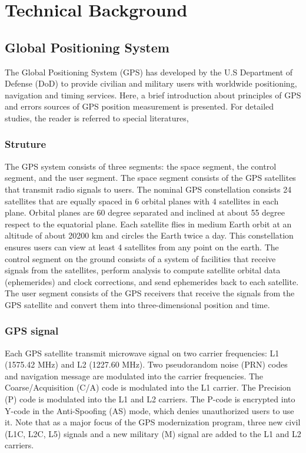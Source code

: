 \chapter{Technical Background}
\section{Global Positioning System}
The Global Positioning System (GPS) has developed by the U.S Department of Defense (DoD) to provide civilian and military users with worldwide positioning, navigation and timing services.  Here, a brief introduction about principles of GPS and errors sources of GPS position measurement is presented.  For detailed studies, the reader is referred to special literatures, \citet[e.g.,][]{dixon1991chpt2,mao1999noise,hofmann2001gps}
  
\subsection{Struture}
The GPS system consists of three segments: the space segment, the control segment, and the user segment.  The space segment consists of the GPS satellites that transmit radio signals to users.  The nominal GPS constellation consists 24 satellites that are equally spaced in 6 orbital planes with 4 satellites in each plane.  Orbital planes are 60 degree separated and inclined at about 55 degree respect to the equatorial plane.  Each satellite flies in medium Earth orbit at an altitude of about 20200 km and circles the Earth twice a day.  This constellation ensures users can view at least 4 satellites from any point on the earth. The control segment on the ground consists of a system of facilities that receive signals from the satellites, perform analysis to compute satellite orbital data (ephemerides) and clock corrections, and send ephemerides back to each satellite.  The user segment consists of the GPS receivers that receive the signals from the GPS satellite and convert them into three-dimensional position and time. 

\subsection{GPS signal}
Each GPS satellite transmit microwave signal on two carrier frequencies: L1 (1575.42 MHz) and L2 (1227.60 MHz).  Two pseudorandom noise (PRN) codes and navigation message are modulated into the carrier frequencies.  The Coarse/Acquisition (C/A) code is modulated into the L1 carrier. The Precision (P) code is modulated into the L1 and L2 carriers.  The P-code is encrypted into Y-code in the Anti-Spoofing (AS) mode, which denies unauthorized users to use it.  Note that as a major focus of the GPS modernization program, three new civil (L1C, L2C, L5) signals and a new military (M) signal are added to the L1 and L2 carriers. 

